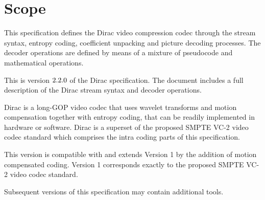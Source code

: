 \section{Scope}
\label{introscope}

This specification defines the Dirac video compression codec through the stream syntax,
 entropy coding, coefficient unpacking and picture decoding processes. The decoder
 operations are defined by means of a mixture of pseudocode and mathematical 
operations.
 
This is version $\text{\text{2}.\text{2}.\text{0}}$ of the Dirac specification. The document includes
a full description of the Dirac stream syntax and decoder operations.

Dirac is a long-GOP video codec that uses wavelet transforms and motion compensation
 together with entropy coding, that can be readily implemented in hardware or software.
Dirac is a superset of the proposed SMPTE VC-2 video codec standard which 
comprises the intra coding parts of this specification.

This version is compatible with and extends Version 1 by the addition of motion
 compensated coding. Version 1 corresponds exactly to the proposed SMPTE VC-2
 video codec standard.

Subsequent versions of this specification may contain additional tools.

